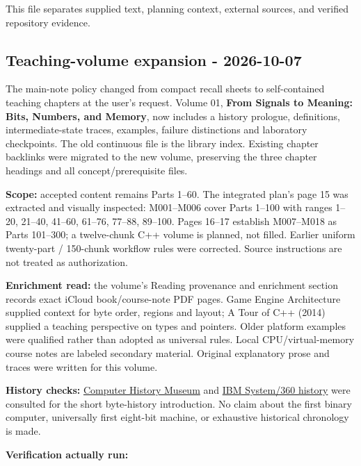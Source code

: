 This file separates supplied text, planning context, external sources, and verified repository evidence.

\subsection{Teaching-volume expansion - 2026-10-07}\label{appendix-a103e7846d21-teaching-volume-expansion---2026-10-07}

\hypertarget{appendix-a103e7846d21-teaching-volume-expansion---2026-10-07}{}

The main-note policy changed from compact recall sheets to self-contained teaching chapters at the user's request. Volume 01, \textbf{From Signals to Meaning: Bits, Numbers, and Memory}, now includes a history prologue, definitions, intermediate-state traces, examples, failure distinctions and laboratory checkpoints. The old continuous file is the library index. Existing chapter backlinks were migrated to the new volume, preserving the three chapter headings and all concept/prerequisite files.

\textbf{Scope:} accepted content remains Parts 1--60. The integrated plan's page 15 was extracted and visually inspected: M001--M006 cover Parts 1--100 with ranges 1--20, 21--40, 41--60, 61--76, 77--88, 89--100. Pages 16--17 establish M007--M018 as Parts 101--300; a twelve-chunk C++ volume is planned, not filled. Earlier uniform twenty-part / 150-chunk workflow rules were corrected. Source instructions are not treated as authorization.

\textbf{Enrichment read:} the volume's Reading provenance and enrichment section records exact iCloud book/course-note PDF pages. Game Engine Architecture supplied context for byte order, regions and layout; A Tour of C++ (2014) supplied a teaching perspective on types and pointers. Older platform examples were qualified rather than adopted as universal rules. Local CPU/virtual-memory course notes are labeled secondary material. Original explanatory prose and traces were written for this volume.

\textbf{History checks:} \href{https://www.computerhistory.org/tdih/october/24/}{Computer History Museum} and \href{https://www.ibm.com/history/system-360}{IBM System/360 history} were consulted for the short byte-history introduction. No claim about the first binary computer, universally first eight-bit machine, or exhaustive historical chronology is made.

\textbf{Verification actually run:}

